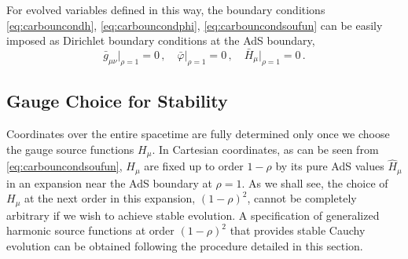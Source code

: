 \documentclass[a4paper,11pt]{article}
\numberwithin{equation}{section}
\begin{document}

For evolved variables defined in this way, the boundary conditions \eqref{eq:carbouncondh}, \eqref{eq:carbouncondphi}, \eqref{eq:carbouncondsoufun} can be easily imposed as  Dirichlet boundary conditions at the AdS boundary,
\begin{equation}
\label{eq:dirbc}
 \bar{g}_{\mu\nu}\big|_{\rho=1}=0\,,\quad \bar{\varphi}\big|_{\rho=1}=0\,,\quad \bar{H}_\mu\big|_{\rho=1}=0\,.
 \end{equation}



\subsection{Gauge Choice for Stability}\label{sec:gauge_choice}

Coordinates over the entire spacetime are fully determined only once we choose the gauge source functions $H_\mu$. 
In Cartesian coordinates, as can be seen from \eqref{eq:carbouncondsoufun}, $H_\mu$ are fixed up to order $1-\rho$ by its pure AdS values $\hat{H}_\mu$ in an expansion near the AdS boundary at $\rho=1$.
As we shall see, the choice of $H_\mu$ at the next order in this expansion, $(1-\rho)^2$, cannot be completely arbitrary if we wish to achieve stable evolution.
A specification of generalized harmonic source functions at order $(1-\rho)^2$ that provides stable Cauchy evolution can be obtained following the procedure detailed in this section.
\end{document}
